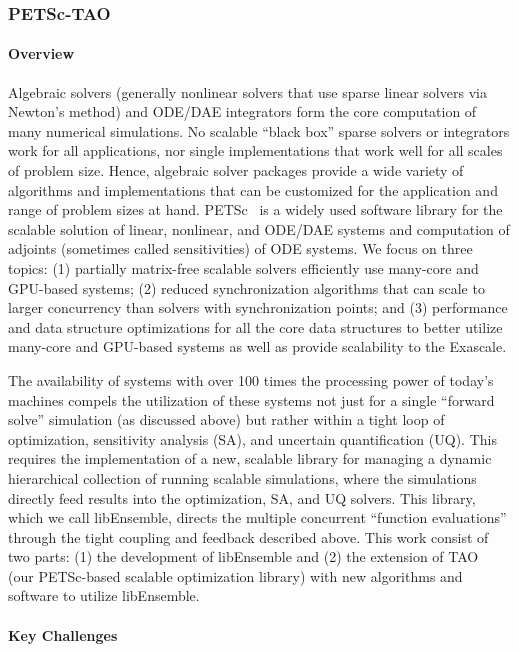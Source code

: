 \subsubsection{PETSc-TAO} \label{subsubsect:petsc}
\paragraph{Overview} 

Algebraic solvers (generally nonlinear solvers that use sparse linear solvers via Newton's method) and ODE/DAE 
integrators form the core computation of many numerical simulations. No scalable ``black box'' sparse solvers 
or integrators work for all applications, nor single implementations that work well for all scales of 
problem size. Hence, algebraic solver packages provide a wide variety of algorithms and implementations 
that can be customized for the application and range of problem sizes at hand. PETSc~\cite{petsc:homepage,petsc-man} 
is a widely used software library for the scalable solution of linear, nonlinear, and ODE/DAE systems and 
computation of adjoints (sometimes called sensitivities) of ODE systems. We focus on three topics: (1) partially 
matrix-free scalable solvers efficiently use many-core and GPU-based systems; (2) reduced synchronization 
algorithms that can scale to larger concurrency than solvers with synchronization points; and (3) performance 
and data structure optimizations for all the core data structures to better utilize many-core and GPU-based 
systems as well as provide scalability to the Exascale.

The availability of systems with over 100 times the processing power of today's machines compels the utilization 
of these systems not just for a single ``forward solve'' simulation (as discussed above) but rather within a 
tight loop of optimization, sensitivity analysis (SA), and uncertain quantification (UQ). This requires the 
implementation of a new, scalable library for managing a dynamic hierarchical collection of running scalable simulations, where the simulations directly feed results into the optimization, SA, and UQ solvers.  This library, 
which we call libEnsemble, directs the multiple concurrent ``function evaluations'' through the tight coupling 
and feedback described above. This work consist of two parts: (1) the development of libEnsemble and (2) the 
extension of TAO~\cite{tao-man} (our PETSc-based scalable optimization library) with new algorithms and 
software to utilize libEnsemble.

\paragraph{Key Challenges}

